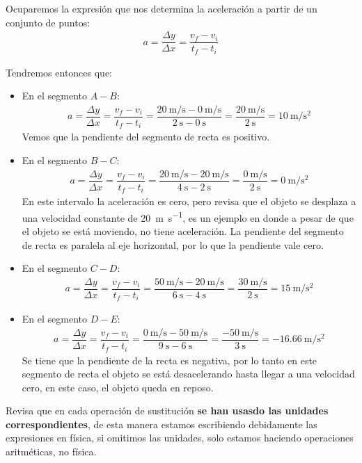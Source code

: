 \documentclass[14pt]{extarticle}
\begin{document}
Ocuparemos la expresión que nos determina la aceleración a partir de un conjunto de puntos:
\begin{align*}
a = \dfrac{\Delta y}{\Delta x} = \dfrac{v_{f} - v_{i}}{t_{f} - t_{i}}
\end{align*}

Tendremos entonces que:
\begin{itemize}
\item En el segmento $A - B$:
\begin{align*}
a = \dfrac{\Delta y}{\Delta x} = \dfrac{v_{f} - v_{i}}{t_{f} - t_{i}} = \dfrac{\displaystyle \SI[per-mode=fraction]{20}{\meter\per\second} - \SI[per-mode=fraction]{0}{\meter\per\second}}{\SI{2}{\second} - \SI{0}{\second}} = \dfrac{ \displaystyle \SI[per-mode=fraction]{20}{\meter\per\second}}{\SI{2}{\second}} = \SI[per-mode=fraction]{10}{\meter\per\square\second}
\end{align*}
Vemos que la pendiente del segmento de recta es positivo.
\item En el segmento $B - C$:
\begin{align*}
a = \dfrac{\Delta y}{\Delta x} = \dfrac{v_{f} - v_{i}}{t_{f} - t_{i}} = \dfrac{\displaystyle \SI[per-mode=fraction]{20}{\meter\per\second} - \SI[per-mode=fraction]{20}{\meter\per\second}}{\SI{4}{\second} - \SI{2}{\second}} = \dfrac{ \displaystyle \SI[per-mode=fraction]{0}{\meter\per\second}}{\SI{2}{\second}} = \SI[per-mode=fraction]{0}{\meter\per\square\second}
\end{align*}
En este intervalo la aceleración es cero, pero revisa que el objeto se desplaza a una velocidad constante de \SI{20}{\meter\per\second}, es un ejemplo en donde a pesar de que el objeto se está moviendo, no tiene aceleración. La pendiente del segmento de recta es paralela al eje horizontal, por lo que la pendiente vale cero.
\item En el segmento $C- D$:
\begin{align*}
a = \dfrac{\Delta y}{\Delta x} = \dfrac{v_{f} - v_{i}}{t_{f} - t_{i}} = \dfrac{\displaystyle \SI[per-mode=fraction]{50}{\meter\per\second} - \SI[per-mode=fraction]{20}{\meter\per\second}}{\SI{6}{\second} - \SI{4}{\second}} = \dfrac{ \displaystyle \SI[per-mode=fraction]{30}{\meter\per\second}}{\SI{2}{\second}} = \SI[per-mode=fraction]{15}{\meter\per\square\second}
\end{align*}
\item En el segmento $D - E$:
\begin{align*}
a = \dfrac{\Delta y}{\Delta x} = \dfrac{v_{f} - v_{i}}{t_{f} - t_{i}} = \dfrac{\displaystyle \SI[per-mode=fraction]{0}{\meter\per\second} - \SI[per-mode=fraction]{50}{\meter\per\second}}{\SI{9}{\second} - \SI{6}{\second}} = \dfrac{ \displaystyle - \SI[per-mode=fraction]{50}{\meter\per\second}}{\SI{3}{\second}} = - \SI[per-mode=fraction]{16.66}{\meter\per\square\second}
\end{align*}
Se tiene que la pendiente de la recta es negativa, por lo tanto en este segmento de recta el objeto se está desacelerando hasta llegar a una velocidad cero, en este caso, el objeto queda en reposo.
\end{itemize}
Revisa que en cada operación de sustitución \textbf{se han usasdo las unidades correspondientes}, de esta manera estamos escribiendo debidamente las expresiones en física, si omitimos las unidades, solo estamos haciendo operaciones aritméticas, no física.
\end{document}
